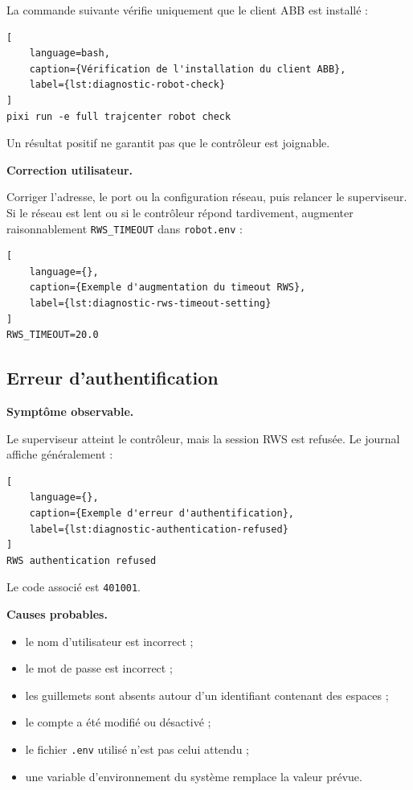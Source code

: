 \documentclass{rapportENSAM}
\begin{document}
La commande suivante vérifie uniquement que le client ABB est installé :

\begin{lstlisting}[
    language=bash,
    caption={Vérification de l'installation du client ABB},
    label={lst:diagnostic-robot-check}
]
pixi run -e full trajcenter robot check
\end{lstlisting}

Un résultat positif ne garantit pas que le contrôleur est joignable.

\textbf{Correction utilisateur.}

Corriger l'adresse, le port ou la configuration réseau, puis relancer le
superviseur. Si le réseau est lent ou si le contrôleur répond tardivement,
augmenter raisonnablement \texttt{RWS\_TIMEOUT} dans
\texttt{robot.env} :

\begin{lstlisting}[
    language={},
    caption={Exemple d'augmentation du timeout RWS},
    label={lst:diagnostic-rws-timeout-setting}
]
RWS_TIMEOUT=20.0
\end{lstlisting}


\subsection{Erreur d'authentification}
\label{subsec:diagnostic-authentication}

\textbf{Symptôme observable.}

Le superviseur atteint le contrôleur, mais la session RWS est refusée. Le
journal affiche généralement :

\begin{lstlisting}[
    language={},
    caption={Exemple d'erreur d'authentification},
    label={lst:diagnostic-authentication-refused}
]
RWS authentication refused
\end{lstlisting}

Le code associé est \texttt{401001}.

\textbf{Causes probables.}

\begin{itemize}
    \item le nom d'utilisateur est incorrect ;
    \item le mot de passe est incorrect ;
    \item les guillemets sont absents autour d'un identifiant contenant des
    espaces ;
    \item le compte a été modifié ou désactivé ;
    \item le fichier \texttt{.env} utilisé n'est pas celui attendu ;
    \item une variable d'environnement du système remplace la valeur prévue.
\end{itemize}
\end{document}
